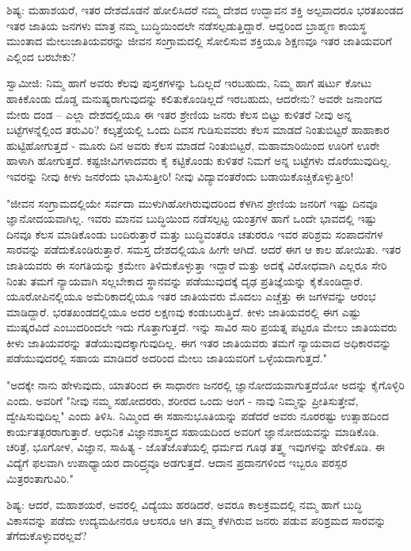 ಶಿಷ್ಯ: ಮಹಾಶಯರೆ, ಇತರ ದೇಶದೊಡನೆ ಹೋಲಿಸಿದರೆ ನಮ್ಮ ದೇಶದ ಉದ್ಭಾವನ ಶಕ್ತಿ ಅಲ್ಪವಾದರೂ ಭರತಖಂಡದ ಇತರ ಜಾತಿಯ ಜನಗಳು ಮಾತ್ರ ನಮ್ಮ ಬುದ್ಧಿಯಿಂದಲೇ ನಡೆಸಲ್ಪಡುತ್ತಿದ್ದಾರೆ. ಆದ್ದರಿಂದ ಬ್ರಾಹ್ಮಣ ಕಾಯಸ್ಥ ಮುಂತಾದ ಮೇಲುಜಾತಿಯವರನ್ನು ಜೀವನ ಸಂಗ್ರಾಮದಲ್ಲಿ ಸೋಲಿಸುವ ಶಕ್ತಿಯೂ ಶಿಕ್ಷಣವೂ ಇತರ ಜಾತಿಯವರಿಗೆ ಎಲ್ಲಿಂದ ಬರಬೇಕು?

ಸ್ವಾಮೀಜಿ: ನಿಮ್ಮ ಹಾಗೆ ಅವರು ಕೆಲವು ಪುಸ್ತಕಗಳನ್ನು ಓದಿಲ್ಲದೆ ಇರಬಹುದು, ನಿಮ್ಮ ಹಾಗೆ ಷರ್ಟು ಕೋಟು ಹಾಕಿಕೊಂಡು ದೊಡ್ಡ ಮನುಷ್ಯರಾಗುವುದನ್ನು ಕಲಿತುಕೊಂಡಿಲ್ಲದೆ ಇರಬಹುದು, ಆದರೇನು? ಅವರೇ ಜನಾಂಗದ ಮೇರು ದಂಡ – ಎಲ್ಲಾ ದೇಶದಲ್ಲಿಯೂ ಈ ಇತರ ಶ್ರೇಣಿಯ ಜನರು ಕೆಲಸ ಬಿಟ್ಟು ಕುಳಿತರೆ ನೀವು ಅನ್ನ ಬಟ್ಟೆಗಳನ್ನೆಲ್ಲಿಂದ ತರುವಿರಿ? ಕಲ್ಕತ್ತೆಯಲ್ಲಿ ಒಂದು ದಿವಸ ಗುಡಿಸುವವರು ಕೆಲಸ ಮಾಡದೆ ನಿಂತುಬಿಟ್ಟರೆ ಹಾಹಾಕಾರ ಹುಟ್ಟಿಹೋಗುತ್ತದೆ - ಮೂರು ದಿನ ಅವರು ಕೆಲಸ ಮಾಡದೆ ನಿಂತುಬಿಟ್ಟರೆ, ಮಹಾಮಾರಿಯಿಂದ ಊರಿಗೆ ಊರೇ ಹಾಳಾಗಿ ಹೋಗುತ್ತದೆ. ಕಷ್ಟಜೀವಿಗಳಾದವರು ಕೈ ಕಟ್ಟಿಕೊಂಡು ಕುಳಿತರೆ ನಿಮಗೆ ಅನ್ನ ಬಟ್ಟೆಗಳು ದೊರೆಯುವುದಿಲ್ಲ. ಇವರನ್ನು ನೀವು ಕೀಳು ಜನರೆಂದು ಭಾವಿಸುತ್ತೀರಿ! ನೀವು ವಿದ್ಯಾವಂತರೆಂದು ಬಡಾಯಿಕೊಚ್ಚಿಕೊಳ್ಳುತ್ತೀರಿ!

"ಜೀವನ ಸಂಗ್ರಾಮದಲ್ಲಿಯೇ ಸರ್ವದಾ ಮುಳುಗಿಹೋಗಿರುವುದರಿಂದ ಕೆಳಗಿನ ಶ್ರೇಣಿಯ ಜನರಿಗೆ ಇಷ್ಟು ದಿನವೂ ಜ್ಞಾನೋದಯವಾಗಿಲ್ಲ. ಇವರು ಮಾನವ ಬುದ್ಧಿಯಿಂದ ನಡೆಸಲ್ಪಟ್ಟ ಯಂತ್ರಗಳ ಹಾಗೆ ಒಂದೇ ಭಾವದಲ್ಲಿ ಇಷ್ಟು ದಿನವೂ ಕೆಲಸ ಮಾಡಿಕೊಂಡು ಬಂದಿರುತ್ತಾರೆ ಮತ್ತು ಬುದ್ಧಿವಂತರೂ ಚತುರರೂ ಇವರ ಪರಿಶ್ರಮ ಸಂಪಾದನೆಗಳ ಸಾರವನ್ನು ಪಡೆದುಕೊಂಡಿರುತ್ತಾರೆ. ಸಮಸ್ತ ದೇಶದಲ್ಲಿಯೂ ಹೀಗೇ ಆಗಿದೆ. ಆದರೆ ಈಗ ಆ ಕಾಲ ಹೋಯಿತು. ಇತರ ಜಾತಿಯವರು ಈ ಸಂಗತಿಯನ್ನು ಕ್ರಮೇಣ ತಿಳಿದುಕೊಳ್ಳುತ್ತಾ ಇದ್ದಾರೆ ಮತ್ತು ಅದಕ್ಕೆ ವಿರೋಧವಾಗಿ ಎಲ್ಲರೂ ಸೇರಿ ನಿಂತು ತಮಗೆ ನ್ಯಾಯವಾಗಿ ಸಲ್ಲಬೇಕಾದ ಸ್ಥಾನವನ್ನು ಪಡೆಯುವುದಕ್ಕೆ ದೃಢ ಪ್ರತಿಜ್ಞೆಯನ್ನು ಕೈಕೊಂಡಿದ್ದಾರೆ. ಯೂರೋಪಿನಲ್ಲಿಯೂ ಅಮೆರಿಕಾದಲ್ಲಿಯೂ ಇತರ ಜಾತಿಯವರು ಮೊದಲು ಎಚ್ಚೆತ್ತು ಈ ಜಗಳವನ್ನು ಆರಂಭ ಮಾಡಿದ್ದಾರೆ. ಭರತಖಂಡದಲ್ಲಿಯೂ ಅದರ ಲಕ್ಷಣವು ಕಂಡುಬರುತ್ತಿದೆ. ಕೀಳು ಜಾತಿಯವರಲ್ಲಿ ಈಗ ಎಷ್ಟು ಮುಷ್ಕರವಿದೆ ಎಂಬುದರಿಂದಲೇ ಇದು ಗೊತ್ತಾಗುತ್ತದೆ. ಇನ್ನು ಸಾವಿರ ಸಾರಿ ಪ್ರಯತ್ನ ಪಟ್ಟರೂ ಮೇಲು ಜಾತಿಯವರು ಕೀಳು ಜಾತಿಯವರನ್ನು ತಡೆಯುವುದಕ್ಕಾಗುವುದಿಲ್ಲ. ಈಗ ಇತರ ಜಾತಿಯವರು ತಮಗೆ ನ್ಯಾಯವಾದ ಅಧಿಕಾರವನ್ನು ಪಡೆಯುವುದರಲ್ಲಿ ಸಹಾಯ ಮಾಡಿದರೆ ಅದರಿಂದ ಮೇಲು ಜಾತಿಯವರಿಗೆ ಒಳ್ಳೆಯದಾಗುತ್ತದೆ."

"ಅದಕ್ಕೇ ನಾನು ಹೇಳುವುದು, ಯಾತರಿಂದ ಈ ಸಾಧಾರಣ ಜನರಲ್ಲಿ ಜ್ಞಾನೋದಯವಾಗುತ್ತದೆಯೋ ಅದನ್ನು ಕೈಗೊಳ್ಳಿರಿ ಎಂದು. ಅವರಿಗೆ "ನೀವು ನಮ್ಮ ಸಹೋದರರು, ಶರೀರದ ಒಂದು ಅಂಗ - ನಾವು ನಿಮ್ಮನ್ನು ಪ್ರೀತಿಸುತ್ತೇವೆ, ದ್ವೇಷಿಸುವುದಿಲ್ಲ" ಎಂದು ತಿಳಿಸಿ. ನಿಮ್ಮಿಂದ ಈ ಸಹಾನುಭೂತಿಯನ್ನು ಪಡೆದರೆ ಅವರು ನೂರರಷ್ಟು ಉತ್ಸಾಹದಿಂದ ಕಾರ್ಯತತ್ಪರರಾಗುತ್ತಾರೆ. ಆಧುನಿಕ ವಿಜ್ಞಾನಶಾಸ್ತ್ರದ ಸಹಾಯದಿಂದ ಅವರಿಗೆ ಜ್ಞಾನೋದಯವನ್ನು ಮಾಡಿಕೊಡಿ. ಚರಿತ್ರೆ, ಭೂಗೋಳ, ವಿಜ್ಞಾನ, ಸಾಹಿತ್ಯ - ಜೊತೆಜೊತೆಯಲ್ಲಿ ಧರ್ಮದ ಗೂಢ ತತ್ತ್ವ ಇವುಗಳನ್ನು ಹೇಳಿಕೊಡಿ. ಈ ವಿದ್ಯೆಗೆ ಫಲವಾಗಿ ಉಪಾಧ್ಯಾಯರ ದಾರಿದ್ರ್ಯವೂ ಅಡಗುತ್ತದೆ. ಆದಾನ ಪ್ರದಾನಗಳಿಂದ ಇಬ್ಬರೂ ಪರಸ್ಪರ ಮಿತ್ರರಂತಾಗುವಿರಿ."

ಶಿಷ್ಯ: ಆದರೆ, ಮಹಾಶಯರೆ, ಅವರಲ್ಲಿ ವಿದ್ಯೆಯು ಹರಡಿದರೆ, ಅವರೂ ಕಾಲಕ್ರಮದಲ್ಲಿ ನಮ್ಮ ಹಾಗೆ ಬುದ್ಧಿ ವಿಕಾಸವನ್ನು ಪಡೆದು ಉದ್ಯಮಹೀನರೂ ಆಲಸರೂ ಆಗಿ ತಮ್ಮ ಕೆಳಗಿರುವ ಜನರು ಪಡುವ ಪರಿಶ್ರಮದ ಸಾರವನ್ನು ತೆಗೆದುಕೊಳ್ಳುವರಲ್ಲವೆ?

